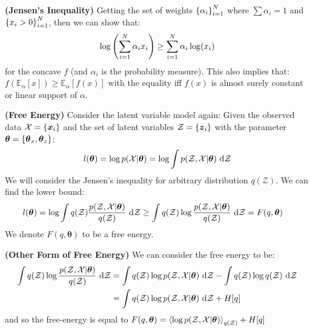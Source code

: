 \begin{theorem}{\textbf{(Jensen's Inequality)}}
    Getting the set of weights $\left\{ \alpha_i \right\}^N_{i=1}$ where $\sum\alpha_i = 1$ and $\left\{ x_i > 0 \right\}^N_{i=1}$, then we can show that:
    \begin{equation*}
        \log\left( \sum^N_{i=1} \alpha_ix_i \right) \ge \sum_{i=1}^N \alpha_i\log(x_i)
    \end{equation*}
    for the concave $f$ (and $\alpha_i$ is the probability measure). This also implies that: $f(\mathbb{E}_\alpha[x]) \ge \mathbb{E}_\alpha[f(x)]$ with the equality iff $f(x)$ is almost surely constant or linear support of $\alpha$.
\end{theorem}

\begin{definition}{\textbf{(Free Energy)}}
    Consider the latent variable model again: Given the observed data $\mathcal{X} = \left\{ \boldsymbol x_i \right\}$ and the set of latent variables $\mathcal{Z} = \left\{ \boldsymbol z_i \right\}$ with the parameter $\boldsymbol \theta = \left\{ \boldsymbol \theta_x, \boldsymbol \theta_z \right\}$:
    \begin{equation*}
        l(\boldsymbol \theta) = \log p(\mathcal{X}|\boldsymbol \theta) = \log \int p(\mathcal{Z}, \mathcal{X} | \boldsymbol \theta)\ \mathrm{d} \mathcal{Z}
    \end{equation*}
    We will consider the Jensen's inequality for arbitrary distribution $q(\mathcal{Z})$. We can find the lower bound:
    \begin{equation*}
    \begin{aligned}
        l(\boldsymbol \theta) &= \log \int q(\mathcal{Z})\frac{p(\mathcal{Z},\mathcal{X} | \boldsymbol \theta)}{q(\mathcal{Z})}\ \mathrm{d} \mathcal{Z} \ge \int q(\mathcal{Z})\log \frac{p(\mathcal{Z}, \mathcal{X} | \boldsymbol \theta)}{q(\mathcal{Z})}\ \mathrm{d} \mathcal{Z} = F(q, \boldsymbol \theta)
    \end{aligned}
    \end{equation*}
    We denote $F(q, \boldsymbol \theta)$ to be a free energy. 
\end{definition}

\begin{remark}{\textbf{(Other Form of Free Energy)}}
    We can consider the free energy to be:
    \begin{equation*}
    \begin{aligned}
        \int q(\mathcal{Z})\log \frac{p(\mathcal{Z} , \mathcal{X} | \boldsymbol \theta)}{q(\mathcal{Z})}\ \mathrm{d}\mathcal{Z} &= \int q(\mathcal{Z}) \log p(\mathcal{Z} , \mathcal{X} | \boldsymbol \theta) \ \mathrm{d} \mathcal{Z} - \int q(\mathcal{Z})\log q(\mathcal{Z})\ \mathrm{d} \mathcal{Z} \\ 
        &= \int q(\mathcal{Z})\log p(\mathcal{Z}, \mathcal{X}|\boldsymbol \theta)\ \mathrm{d} \mathcal{Z} + H[q]
    \end{aligned}
    \end{equation*}
    and so the free-energy is equal to $F(q, \boldsymbol \theta) = \left\langle \log p(\mathcal{Z}, \mathcal{X} | \boldsymbol \theta) \right\rangle_{q(\mathcal{Z})} + H[q]$
\end{remark}

